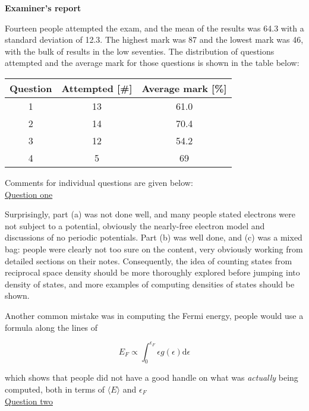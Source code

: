 \documentclass[12pt,a4paper]{article}
\newcommand{\ul}[1]{\underline{#1}}
\begin{document}
			\begin{answer}

				\noindent \textbf{Examiner's report}

				Fourteen people attempted the exam, and the mean of the results was 64.3 with a standard deviation of 12.3. The highest mark was 87 and the lowest mark was 46, with the bulk of results in the low seventies. The distribution of questions attempted and the average mark for those questions is shown in the table below:

				\begin{center}
					\begin{tabular}{|c|c|c|}
						\hline
						Question & Attempted [\#] & Average mark [\%] \\
						\hline
					 	1 & 13 & 61.0 \\
					 	2 & 14 & 70.4 \\
					 	3 & 12 & 54.2 \\
						4 & 5 & 69 \\
						\hline
					\end{tabular}
				\end{center}

				Comments for individual questions are given below:\\

				\noindent \ul{Question one}

				Surprisingly, part (a) was not done well, and many people stated electrons were not subject to a potential, obviously the nearly-free electron model and discussions of no periodic potentials. Part (b) was well done, and (c) was a mixed bag: people were clearly not too sure on the content, very obviously working from detailed sections on their notes. Consequently, the idea of counting states from reciprocal space density should be more thoroughly explored before jumping into density of states, and more examples of computing densities of states should be shown.

				Another common mistake was in computing the Fermi energy, people would use a formula along the lines of

				$$
				E_F \propto \int_0^{\epsilon_F} \epsilon g(\epsilon) \mathrm{d}\epsilon
				$$

				which shows that people did not have a good handle on what was \emph{actually} being computed, both in terms of $\langle E \rangle$ and $\epsilon_F$ \\

				\noindent \ul{Question two}


\end{answer}
\end{document}
